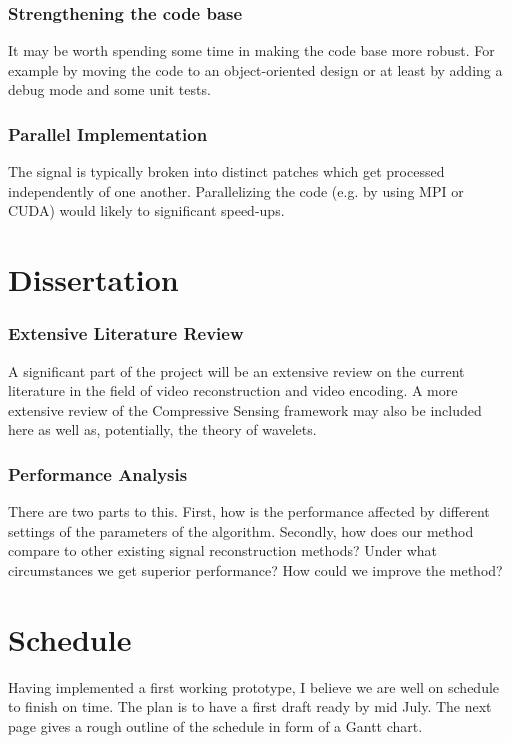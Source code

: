 \documentclass[final,3p]{report}
\begin{document}
\subsubsection{Strengthening the code base}
It may be worth spending some time in making the code base more robust.
For example by moving the code to an object-oriented design or at least by adding a debug mode and some unit tests.

\subsubsection{Parallel Implementation}
The signal is typically broken into distinct patches which get processed independently of one another.
Parallelizing the code (e.g. by using MPI or CUDA) would likely to significant speed-ups.

\section{Dissertation}
\subsubsection{Extensive Literature Review}
A significant part of the project will be an extensive review on the current literature in the field of video reconstruction and video encoding.
A more extensive review of the Compressive Sensing framework may also be included here as well as, potentially, the theory of wavelets. 


\subsubsection{Performance Analysis}
There are two parts to this. First, how is the performance affected by different settings of the parameters of the algorithm.
Secondly, how does our method compare to other existing signal reconstruction methods? Under what circumstances we get superior performance? How could we improve the method?

\section{Schedule}
Having implemented a first working prototype, I believe we are well on schedule to finish on time.
The plan is to have a first draft ready by mid July.
The next page gives a rough outline of the schedule in form of a Gantt chart.


\end{document}
